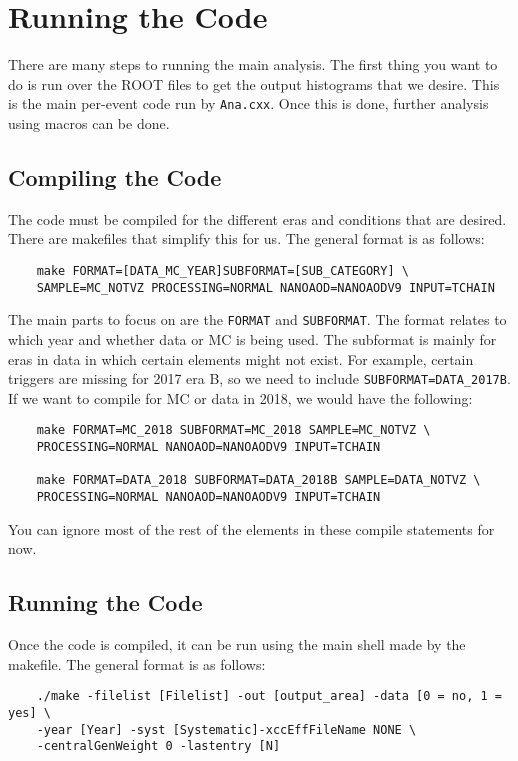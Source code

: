\chapter{Running the Code}\label{ch:run_code}
There are many steps to running the main analysis. The first thing you want to do is run over the ROOT files to get the output histograms that we desire. This is the main per-event code run by \verb|Ana.cxx|. Once this is done, further analysis using macros can be done. 

\section{Compiling the Code}
The code must be compiled for the different eras and conditions that are desired. There are makefiles that simplify this for us. The general format is as follows:

\begin{verbatim}
    make FORMAT=[DATA_MC_YEAR]SUBFORMAT=[SUB_CATEGORY] \ 
    SAMPLE=MC_NOTVZ PROCESSING=NORMAL NANOAOD=NANOAODV9 INPUT=TCHAIN
\end{verbatim}

\noindent The main parts to focus on are the \verb|FORMAT| and \verb|SUBFORMAT|. The format relates to which year and whether data or MC is being used. The subformat is mainly for eras in data in which certain elements might not exist. For example, certain triggers are missing for 2017 era B, so we need to include \verb|SUBFORMAT=DATA_2017B|. If we want to compile for MC or data in 2018, we would have the following:

\begin{verbatim}
    make FORMAT=MC_2018 SUBFORMAT=MC_2018 SAMPLE=MC_NOTVZ \
    PROCESSING=NORMAL NANOAOD=NANOAODV9 INPUT=TCHAIN

    make FORMAT=DATA_2018 SUBFORMAT=DATA_2018B SAMPLE=DATA_NOTVZ \
    PROCESSING=NORMAL NANOAOD=NANOAODV9 INPUT=TCHAIN
\end{verbatim}

\noindent You can ignore most of the rest of the elements in these compile statements for now.

\section{Running the Code}
Once the code is compiled, it can be run using the main shell made by the makefile. The general format is as follows:

\begin{verbatim}
    ./make -filelist [Filelist] -out [output_area] -data [0 = no, 1 = yes] \
    -year [Year] -syst [Systematic]-xccEffFileName NONE \
    -centralGenWeight 0 -lastentry [N]
\end{verbatim}

